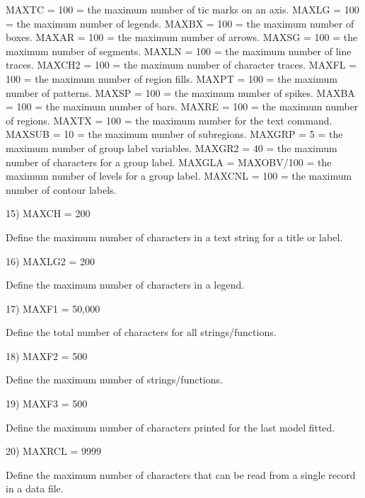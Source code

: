      MAXTC    = 100    = the maximum number of tic marks on an axis.
     MAXLG    = 100    = the maximum number of legends.
     MAXBX    = 100    = the maximum number of boxes.
     MAXAR    = 100    = the maximum number of arrows.
     MAXSG    = 100    = the maximum number of segments.
     MAXLN    = 100    = the maximum number of line traces.
     MAXCH2   = 100    = the maximum number of character traces.
     MAXFL    = 100    = the maximum number of region fills.
     MAXPT    = 100    = the maximum number of patterns.
     MAXSP    = 100    = the maximum number of spikes.
     MAXBA    = 100    = the maximum number of bars.
     MAXRE    = 100    = the maximum number of regions.
     MAXTX    = 100    = the maximum number for the text command.
     MAXSUB   = 10     = the maximum number of subregions.
     MAXGRP   = 5      = the maximum number of group label variables.
     MAXGR2   = 40     = the maximum number of characters for a group
                         label.
     MAXGLA   = MAXOBV/100  = the maximum number of levels for a
                              group label.
     MAXCNL   = 100    = the maximum number of contour labels.

 15) MAXCH    = 200

     Define the maximum number of characters in a text string for a
     title or label.

 16) MAXLG2   = 200

     Define the maximum number of characters in a legend.

 17) MAXF1    = 50,000

     Define the total number of characters for all strings/functions.

 18) MAXF2    = 500

     Define the maximum number of strings/functions.

 19) MAXF3    = 500

     Define the maximum number of characters printed for the last
     model fitted.

 20) MAXRCL   = 9999

     Define the maximum number of characters that can be read from a
     single record in a data file.






